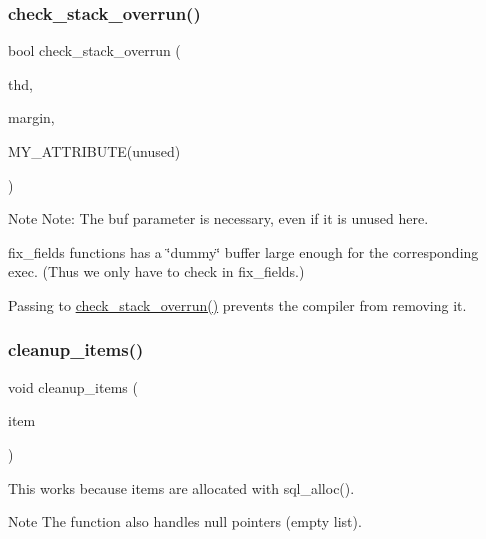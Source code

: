 \subsubsection{\texorpdfstring{check\+\_\+stack\+\_\+overrun()}{check\_stack\_overrun()}}
{\footnotesize\ttfamily bool check\+\_\+stack\+\_\+overrun (\begin{DoxyParamCaption}\item[{T\+HD $\ast$}]{thd,  }\item[{long}]{margin,  }\item[{uchar $\ast$buf }]{M\+Y\+\_\+\+A\+T\+T\+R\+I\+B\+U\+TE(unused) }\end{DoxyParamCaption})}

\begin{DoxyNote}{Note}
Note\+: The \textquotesingle{}buf\textquotesingle{} parameter is necessary, even if it is unused here.
\begin{DoxyItemize}
\item fix\+\_\+fields functions has a \char`\"{}dummy\char`\"{} buffer large enough for the corresponding exec. (Thus we only have to check in fix\+\_\+fields.)
\item Passing to \mbox{\hyperlink{group__Runtime__Environment_ga9a660aa2196395412bc0c5c8e7baa33a}{check\+\_\+stack\+\_\+overrun()}} prevents the compiler from removing it. 
\end{DoxyItemize}
\end{DoxyNote}
\mbox{\label{group__Runtime__Environment_gaf7bccb54271a0546d92f2bc732abf3d1}} 
\subsubsection{\texorpdfstring{cleanup\+\_\+items()}{cleanup\_items()}}
{\footnotesize\ttfamily void cleanup\+\_\+items (\begin{DoxyParamCaption}\item[{\mbox{\hyperlink{classItem}{Item}} $\ast$}]{item }\end{DoxyParamCaption})}

This works because items are allocated with sql\+\_\+alloc(). \begin{DoxyNote}{Note}
The function also handles null pointers (empty list). 
\end{DoxyNote}
\mbox{\label{group__Runtime__Environment_ga8ba3e531f8d364506ca098138bd4b459}} 

